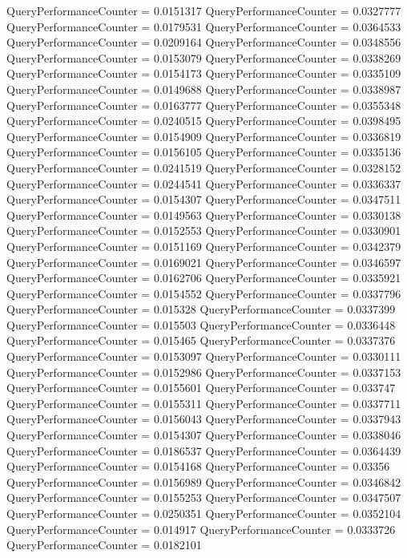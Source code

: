 \documentclass[9pt]{article}
\theoremstyle{plain}
\theoremstyle{definition}
\theoremstyle{remark}
\numberwithin{equation}{section}
\begin{document}
QueryPerformanceCounter  =  0.0151317
QueryPerformanceCounter  =  0.0327777
QueryPerformanceCounter  =  0.0179531
QueryPerformanceCounter  =  0.0364533
QueryPerformanceCounter  =  0.0209164
QueryPerformanceCounter  =  0.0348556
QueryPerformanceCounter  =  0.0153079
QueryPerformanceCounter  =  0.0338269
QueryPerformanceCounter  =  0.0154173
QueryPerformanceCounter  =  0.0335109
QueryPerformanceCounter  =  0.0149688
QueryPerformanceCounter  =  0.0338987
QueryPerformanceCounter  =  0.0163777
QueryPerformanceCounter  =  0.0355348
QueryPerformanceCounter  =  0.0240515
QueryPerformanceCounter  =  0.0398495
QueryPerformanceCounter  =  0.0154909
QueryPerformanceCounter  =  0.0336819
QueryPerformanceCounter  =  0.0156105
QueryPerformanceCounter  =  0.0335136
QueryPerformanceCounter  =  0.0241519
QueryPerformanceCounter  =  0.0328152
QueryPerformanceCounter  =  0.0244541
QueryPerformanceCounter  =  0.0336337
QueryPerformanceCounter  =  0.0154307
QueryPerformanceCounter  =  0.0347511
QueryPerformanceCounter  =  0.0149563
QueryPerformanceCounter  =  0.0330138
QueryPerformanceCounter  =  0.0152553
QueryPerformanceCounter  =  0.0330901
QueryPerformanceCounter  =  0.0151169
QueryPerformanceCounter  =  0.0342379
QueryPerformanceCounter  =  0.0169021
QueryPerformanceCounter  =  0.0346597
QueryPerformanceCounter  =  0.0162706
QueryPerformanceCounter  =  0.0335921
QueryPerformanceCounter  =  0.0154552
QueryPerformanceCounter  =  0.0337796
QueryPerformanceCounter  =  0.015328
QueryPerformanceCounter  =  0.0337399
QueryPerformanceCounter  =  0.015503
QueryPerformanceCounter  =  0.0336448
QueryPerformanceCounter  =  0.015465
QueryPerformanceCounter  =  0.0337376
QueryPerformanceCounter  =  0.0153097
QueryPerformanceCounter  =  0.0330111
QueryPerformanceCounter  =  0.0152986
QueryPerformanceCounter  =  0.0337153
QueryPerformanceCounter  =  0.0155601
QueryPerformanceCounter  =  0.033747
QueryPerformanceCounter  =  0.0155311
QueryPerformanceCounter  =  0.0337711
QueryPerformanceCounter  =  0.0156043
QueryPerformanceCounter  =  0.0337943
QueryPerformanceCounter  =  0.0154307
QueryPerformanceCounter  =  0.0338046
QueryPerformanceCounter  =  0.0186537
QueryPerformanceCounter  =  0.0364439
QueryPerformanceCounter  =  0.0154168
QueryPerformanceCounter  =  0.03356
QueryPerformanceCounter  =  0.0156989
QueryPerformanceCounter  =  0.0346842
QueryPerformanceCounter  =  0.0155253
QueryPerformanceCounter  =  0.0347507
QueryPerformanceCounter  =  0.0250351
QueryPerformanceCounter  =  0.0352104
QueryPerformanceCounter  =  0.014917
QueryPerformanceCounter  =  0.0333726
QueryPerformanceCounter  =  0.0182101
\end{document}
